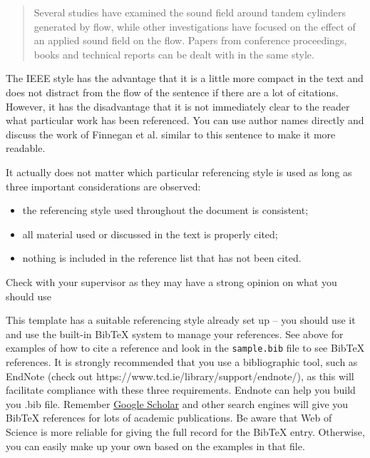 \begin{quote}
Several studies have examined the sound field around tandem cylinders generated by flow\cite{fitzpatrick2003flow,finnegan2010experimental}, while other investigations have focused on the effect of an applied sound field on the flow\cite{hall2003vortex}. Papers from conference proceedings\cite{jordan2001array}, books\cite{paidoussis2010fluid} and technical reports\cite{reyes2007power} can be dealt with in the same style.
\end{quote}

The IEEE style has the advantage that it is a little more compact in the text and does not distract from the flow of the sentence if there are a lot of citations. However, it has the disadvantage that it is not immediately clear to the reader what particular work has been referenced. You can use author names directly and discuss the work of Finnegan et al. \cite{finnegan2010experimental} similar to this sentence to make it more readable. 

It actually does not matter which particular referencing style is used as long as three important considerations are observed:
\begin{itemize}
\item the referencing style used throughout the document is consistent;
\item all material used or discussed in the text is properly cited;
\item nothing is included in the reference list that has not been cited.
\end{itemize}

Check with your supervisor as they may have a strong opinion on what you should use

This template has a suitable referencing style already set up -- you should use it and use the built-in BibTeX system to manage your references. See above for examples of how to cite a reference and look in the \texttt{sample.bib} file to see BibTeX references. It is strongly recommended that you use a bibliographic tool, such as EndNote (check out https://www.tcd.ie/library/support/endnote/), as this will facilitate compliance with these three requirements. Endnote can help you build you .bib file. Remember \href{http://scholar.google.com}{Google Scholar} and other search engines will give you BibTeX references for lots of academic publications. Be aware that Web of Science is more reliable for giving the full record for the BibTeX entry. Otherwise, you can easily make up your own based on the examples in that file.